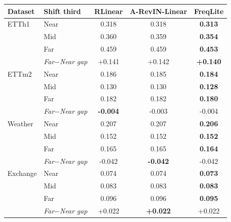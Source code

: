 \begin{tabular}{llccc}
\toprule
Dataset & Shift third & RLinear & A-RevIN-Linear & FreqLite \\
\midrule
ETTh1 & Near & 0.318 & 0.318 & \textbf{0.313} \\
 & Mid & 0.360 & 0.359 & \textbf{0.354} \\
 & Far & 0.459 & 0.459 & \textbf{0.453} \\
 & \emph{Far$-$Near gap} & +0.141 & +0.142 & \textbf{+0.140} \\
\midrule
ETTm2 & Near & 0.186 & 0.185 & \textbf{0.184} \\
 & Mid & 0.130 & 0.130 & \textbf{0.128} \\
 & Far & 0.182 & 0.182 & \textbf{0.180} \\
 & \emph{Far$-$Near gap} & \textbf{-0.004} & -0.003 & -0.004 \\
\midrule
Weather & Near & 0.207 & 0.207 & \textbf{0.206} \\
 & Mid & 0.152 & 0.152 & \textbf{0.152} \\
 & Far & 0.165 & 0.165 & \textbf{0.164} \\
 & \emph{Far$-$Near gap} & -0.042 & \textbf{-0.042} & -0.042 \\
\midrule
Exchange & Near & 0.074 & 0.074 & \textbf{0.073} \\
 & Mid & 0.083 & 0.083 & \textbf{0.083} \\
 & Far & 0.096 & 0.096 & \textbf{0.095} \\
 & \emph{Far$-$Near gap} & +0.022 & \textbf{+0.022} & +0.022 \\
\bottomrule
\end{tabular}